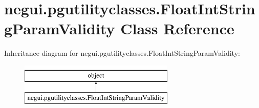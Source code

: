 \hypertarget{classnegui_1_1pgutilityclasses_1_1FloatIntStringParamValidity}{}\section{negui.\+pgutilityclasses.\+Float\+Int\+String\+Param\+Validity Class Reference}
\label{classnegui_1_1pgutilityclasses_1_1FloatIntStringParamValidity}
Inheritance diagram for negui.\+pgutilityclasses.\+Float\+Int\+String\+Param\+Validity\+:\begin{figure}[H]
\begin{center}
\leavevmode
\includegraphics[height=2.000000cm]{classnegui_1_1pgutilityclasses_1_1FloatIntStringParamValidity}
\end{center}
\end{figure}
